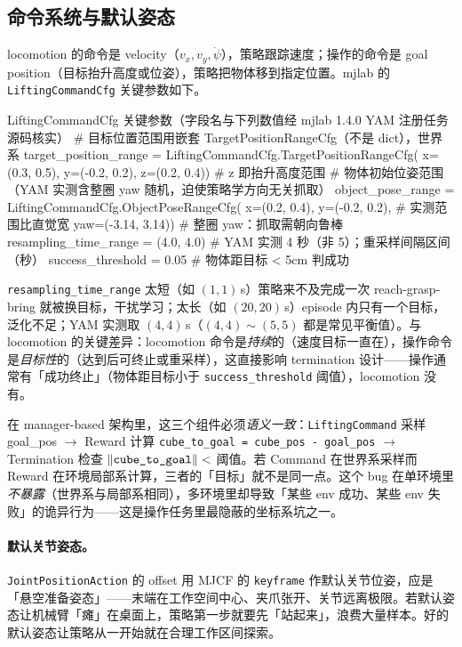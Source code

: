 \subsection{命令系统与默认姿态}
\label{sec:rlmc-manip-cmd}

locomotion 的命令是 velocity（$v_x,v_y,\dot\psi$），策略跟踪速度；操作的命令是 goal position（目标抬升高度或位姿），策略把物体移到指定位置。mjlab 的 \verb|LiftingCommandCfg| 关键参数如下。

\begin{codebox}[Python]{LiftingCommandCfg 关键参数（字段名与下列数值经 mjlab 1.4.0 YAM 注册任务源码核实）}
# 目标位置范围用嵌套 TargetPositionRangeCfg（不是 dict），世界系
target_position_range = LiftingCommandCfg.TargetPositionRangeCfg(
    x=(0.3, 0.5), y=(-0.2, 0.2), z=(0.2, 0.4))   # z 即抬升高度范围
# 物体初始位姿范围（YAM 实测含整圈 yaw 随机，迫使策略学方向无关抓取）
object_pose_range = LiftingCommandCfg.ObjectPoseRangeCfg(
    x=(0.2, 0.4), y=(-0.2, 0.2),                  # 实测范围比直觉宽
    yaw=(-3.14, 3.14))                            # 整圈 yaw：抓取需朝向鲁棒
resampling_time_range = (4.0, 4.0)   # YAM 实测 4 秒（非 5）；重采样间隔区间（秒）
success_threshold = 0.05             # 物体距目标 < 5cm 判成功
\end{codebox}

\verb|resampling_time_range| 太短（如 $(1,1)$\,s）策略来不及完成一次 reach-grasp-bring 就被换目标，干扰学习；太长（如 $(20,20)$\,s）episode 内只有一个目标，泛化不足；YAM 实测取 $(4,4)$\,s（$(4,4)\sim(5,5)$ 都是常见平衡值）。与 locomotion 的关键差异：locomotion 命令是\emph{持续}的（速度目标一直在），操作命令是\emph{目标性}的（达到后可终止或重采样），这直接影响 termination 设计——操作通常有「成功终止」（物体距目标小于 \verb|success_threshold| 阈值），locomotion 没有。

\begin{insight}\label{ins:rlmc-manip-contract}
在 manager-based 架构里，这三个组件必须\emph{语义一致}：\verb|LiftingCommand| 采样 goal\_pos $\to$ Reward 计算 \verb|cube_to_goal = cube_pos - goal_pos| $\to$ Termination 检查 $\|\verb|cube_to_goal|\| < $ 阈值。若 Command 在世界系采样而 Reward 在环境局部系计算，三者的「目标」就不是同一点。这个 bug 在单环境里\emph{不暴露}（世界系与局部系相同），多环境里却导致「某些 env 成功、某些 env 失败」的诡异行为——这是操作任务里最隐蔽的坐标系坑之一。
\end{insight}

\paragraph{默认关节姿态。}\verb|JointPositionAction| 的 offset 用 MJCF 的 \verb|keyframe| 作默认关节位姿，应是「悬空准备姿态」——末端在工作空间中心、夹爪张开、关节远离极限。若默认姿态让机械臂「瘫」在桌面上，策略第一步就要先「站起来」，浪费大量样本。好的默认姿态让策略从一开始就在合理工作区间探索。

